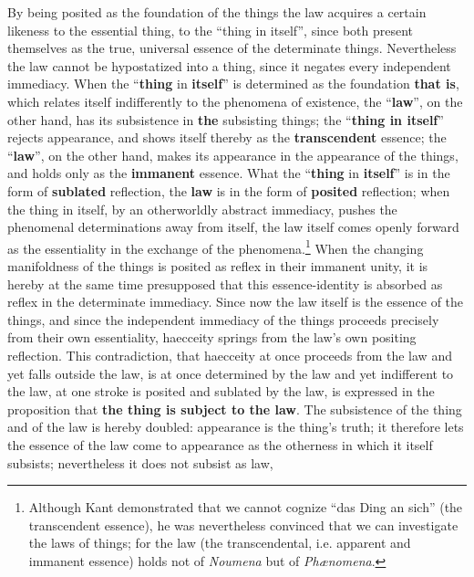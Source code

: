 \documentclass[12pt,a4paper,openany]{book}
\newcommand{\opage}[1]{\marginnote{\footnotesize\textit{[#1]}}}
\begin{document}
By being posited as the foundation of the things
the law acquires a certain likeness to the essential thing,
to the ``thing in itself'', since both present themselves as
the true, universal essence of the determinate things. Nevertheless
the law cannot be hypostatized into a thing, since
it negates every independent immediacy.
When the ``\textbf{thing} in \textbf{itself}'' is determined as the
foundation \textbf{that is}, which relates itself indifferently to
the phenomena of existence, the ``\textbf{law}'', on the other hand,
has its subsistence in \textbf{the} subsisting things; the ``\textbf{thing
in itself}'' rejects appearance, and shows itself
\setcounter{footnote}{0}%
\opage{184}thereby as the \textbf{transcendent} essence; the ``\textbf{law}'',
on the other hand, makes its appearance in the appearance of the things,
and holds only as the \textbf{immanent} essence.
What the ``\textbf{thing} in \textbf{itself}'' is in the form of \textbf{sublated}
reflection, the \textbf{law} is in the form of \textbf{posited} reflection;
when the thing in itself, by an otherworldly abstract immediacy, pushes the phenomenal determinations
away from itself, the law itself comes openly
forward as the essentiality in the exchange of the phenomena.\footnote{Although Kant demonstrated that we cannot cognize ``das Ding an sich'' (the transcendent essence), he was nevertheless convinced that we can investigate the laws of things; for the law (the transcendental, i.e. apparent and immanent essence) holds not of \textit{Noumena} but of \textit{Phænomena}.} When the changing manifoldness of the things is posited
as reflex in their immanent unity, it is hereby
at the same time presupposed that this essence-identity is absorbed
as reflex in the determinate immediacy.
Since now the law itself is the essence of the things, and since the
independent immediacy of the things proceeds precisely
from their own essentiality, haecceity springs
from the law's own positing reflection. This
contradiction, that haecceity at once proceeds
from the law and yet falls outside the law, is at
once determined by the law and yet indifferent to the law,
at one stroke is posited and sublated by %
the law, is expressed in the proposition that \textbf{the thing is
subject to the law}. The subsistence of the thing and of the law
is hereby doubled: appearance is the thing's
truth; it therefore lets the essence of the law
come to appearance as the otherness in which it
itself subsists; nevertheless it does not subsist as law,
\setcounter{footnote}{0}%
\end{document}
